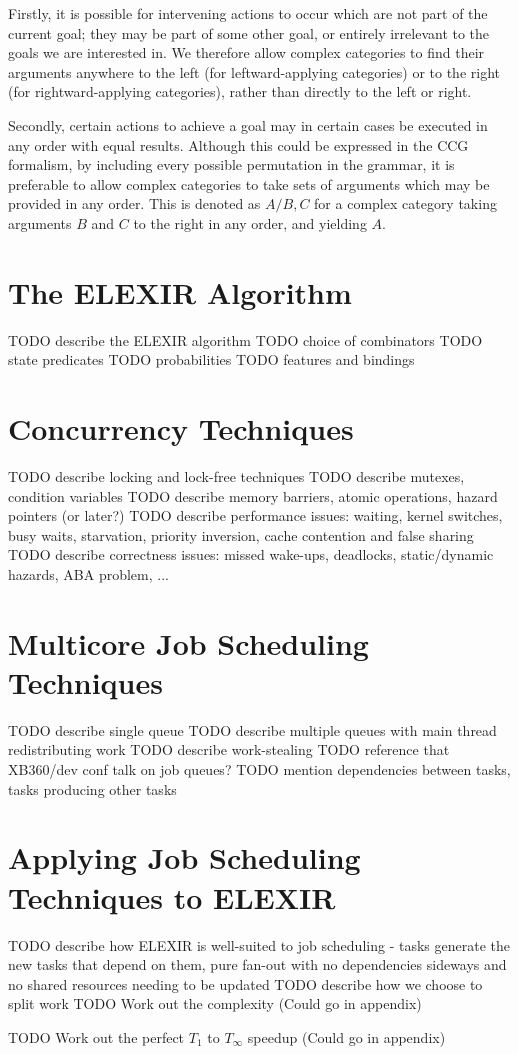 Firstly, it is possible for intervening actions to occur which are not part of the current goal; they may be part of some other goal, or entirely irrelevant to the goals we are interested in. We therefore allow complex categories to find their arguments anywhere to the left (for leftward-applying categories) or to the right (for rightward-applying categories), rather than directly to the left or right.

Secondly, certain actions to achieve a goal may in certain cases be executed in any order with equal results. Although this could be expressed in the \ac{CCG} formalism, by including every possible permutation in the grammar, it is preferable to allow complex categories to take sets of arguments which may be provided in any order. This is denoted as $A/{B, C}$ for a complex category taking arguments $B$ and $C$ to the right in any order, and yielding $A$.

\section{The ELEXIR Algorithm}

TODO describe the ELEXIR algorithm
TODO choice of combinators
TODO state predicates
TODO probabilities
TODO features and bindings

\section{Concurrency Techniques}

TODO describe locking and lock-free techniques
TODO describe mutexes, condition variables
TODO describe memory barriers, atomic operations, hazard pointers (or later?)
TODO describe performance issues: waiting, kernel switches, busy waits, starvation, priority inversion, cache contention and false sharing
TODO describe correctness issues: missed wake-ups, deadlocks, static/dynamic hazards, ABA problem, ...

\section{Multicore Job Scheduling Techniques}

TODO describe single queue
TODO describe multiple queues with main thread redistributing work
TODO describe work-stealing
TODO reference that XB360/dev conf talk on job queues?
TODO mention dependencies between tasks, tasks producing other tasks

\section{Applying Job Scheduling Techniques to ELEXIR}

TODO describe how ELEXIR is well-suited to job scheduling - tasks generate the new tasks that depend on them, pure fan-out with no dependencies sideways and no shared resources needing to be updated
TODO describe how we choose to split work
TODO Work out the complexity (Could go in appendix)

TODO Work out the perfect $T_1$ to $T_\infty$ speedup (Could go in appendix)
